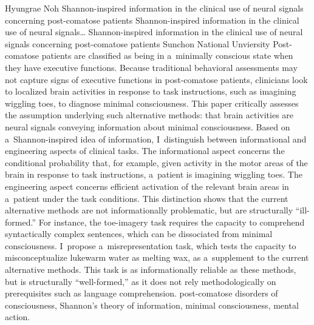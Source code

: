 \begin{artengenv}{Hyungrae Noh}
	{Shannon-inspired information in the clinical use of neural signals concerning post-comatose patients}
	{Shannon-inspired information in the clinical use of neural signals\ldots}
	{Shannon-inspired information in the clinical use of neural signals concerning post-comatose patients}
	{Sunchon National Unviersity}
	{Post-comatose patients are classified as being in a~minimally conscious state when they have executive functions. Because traditional behavioral assessments may not capture signs of executive functions in post-comatose patients, clinicians look to localized brain activities in response to task instructions, such as imagining wiggling toes, to diagnose minimal consciousness. This paper critically assesses the assumption underlying such alternative methods: that brain activities are neural signals conveying information about minimal consciousness. Based on a~Shannon-inspired idea of information, I~distinguish between informational and engineering aspects of clinical tasks. The informational aspect concerns the conditional probability that, for example, given activity in the motor areas of the brain in response to task instructions, a~patient is imagining wiggling toes. The engineering aspect concerns efficient activation of the relevant brain areas in a~patient under the task conditions. This distinction shows that the current alternative methods are not informationally problematic, but are structurally ``ill-formed.'' For instance, the toe-imagery task requires the capacity to comprehend syntactically complex sentences, which can be dissociated from minimal consciousness. I~propose a~misrepresentation task, which tests the capacity to misconceptualize lukewarm water as melting wax, as a~supplement to the current alternative methods. This task is as informationally reliable as these methods, but is structurally ``well-formed,'' as it does not rely methodologically on prerequisites such as language comprehension.
	}
	{post-comatose disorders of consciousness, Shannon's theory of information, minimal consciousness, mental action.}
	
	






\end{artengenv}
